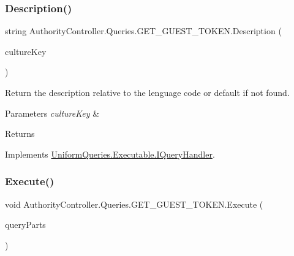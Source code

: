 \subsubsection{\texorpdfstring{Description()}{Description()}}
{\footnotesize\ttfamily string Authority\+Controller.\+Queries.\+G\+E\+T\+\_\+\+G\+U\+E\+S\+T\+\_\+\+T\+O\+K\+E\+N.\+Description (\begin{DoxyParamCaption}\item[{string}]{culture\+Key }\end{DoxyParamCaption})}



Return the description relative to the lenguage code or default if not found. 


\begin{DoxyParams}{Parameters}
{\em culture\+Key} & \\
\hline
\end{DoxyParams}
\begin{DoxyReturn}{Returns}

\end{DoxyReturn}


Implements \mbox{\hyperlink{interface_uniform_queries_1_1_executable_1_1_i_query_handler_ae0e55919571d5456af31298394d241a9}{Uniform\+Queries.\+Executable.\+I\+Query\+Handler}}.

\mbox{\label{class_authority_controller_1_1_queries_1_1_g_e_t___g_u_e_s_t___t_o_k_e_n_a99b0dddf4ff45771e546ec0fa14b0aae}} 
\subsubsection{\texorpdfstring{Execute()}{Execute()}}
{\footnotesize\ttfamily void Authority\+Controller.\+Queries.\+G\+E\+T\+\_\+\+G\+U\+E\+S\+T\+\_\+\+T\+O\+K\+E\+N.\+Execute (\begin{DoxyParamCaption}\item[{\mbox{\hyperlink{struct_uniform_queries_1_1_query_part}{Query\+Part}} \mbox{[}$\,$\mbox{]}}]{query\+Parts }\end{DoxyParamCaption})}



